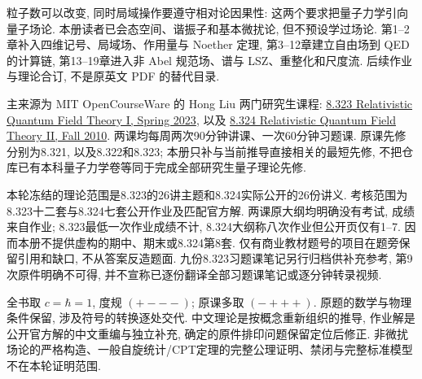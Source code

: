 \originalpreface
粒子数可以改变, 同时局域操作要遵守相对论因果性: 这两个要求把量子力学引向量子场论. 本册读者已会态空间、谐振子和基本微扰论, 但不预设学过场论. 第1--2章补入四维记号、局域场、作用量与 Noether 定理, 第3--12章建立自由场到 QED 的计算链, 第13--19章进入非 Abel 规范场、谱与 LSZ、重整化和尺度流. 后续作业与理论合订, 不是原英文 PDF 的替代目录.

主来源为 MIT OpenCourseWare 的 Hong Liu 两门研究生课程: \href{https://ocw.mit.edu/courses/8-323-relativistic-quantum-field-theory-i-spring-2023/}{8.323 Relativistic Quantum Field Theory I, Spring 2023}, 以及 \href{https://ocw.mit.edu/courses/8-324-relativistic-quantum-field-theory-ii-fall-2010/}{8.324 Relativistic Quantum Field Theory II, Fall 2010}. 两课均每周两次90分钟讲课、一次60分钟习题课. 原课先修分别为8.321, 以及8.322和8.323; 本册只补与当前推导直接相关的最短先修, 不把仓库已有本科量子力学卷等同于完成全部研究生量子理论先修.

本轮冻结的理论范围是8.323的26讲主题和8.324实际公开的26份讲义. 考核范围为8.323十二套与8.324七套公开作业及匹配官方解. 两课原大纲均明确没有考试, 成绩来自作业; 8.323最低一次作业成绩不计, 8.324大纲称八次作业但公开页仅有1--7. 因而本册不提供虚构的期中、期末或8.324第8套. 仅有商业教材题号的项目在题旁保留引用和缺口, 不从答案反造题面. 九份8.323习题课笔记另行归档供补充参考, 第9次原件明确不可得, 并不宣称已逐份翻译全部习题课笔记或逐分钟转录视频.

全书取 $c=\hbar=1$, 度规 $(+---)$; 原课多取 $(-+++)$. 原题的数学与物理条件保留, 涉及符号的转换逐处交代. 中文理论是按概念重新组织的推导, 作业解是公开官方解的中文重编与独立补充, 确定的原件排印问题保留定位后修正. 非微扰场论的严格构造、一般自旋统计/CPT定理的完整公理证明、禁闭与完整标准模型不在本轮证明范围.

